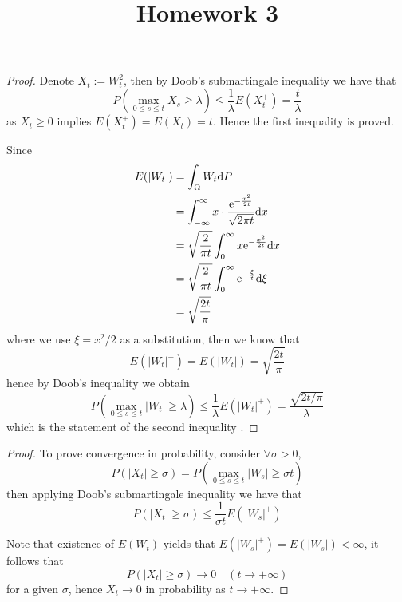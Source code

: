\documentclass{homework}
\title{Homework 3}
\begin{document}
    \maketitle

    \problem
    \begin{proof}
        Denote $X_t:=W_t^2$, then by Doob's submartingale inequality
        we have that
        \[P\left(\max_{0\leq s\leq t}X_s\geq\lambda\right)
        \leq\frac{1}{\lambda}E(X_t^+)=\frac{t}{\lambda}\]
        as $X_t\geq 0$ implies $E(X_t^+)=E(X_t)=t$. Hence the
        first inequality is proved.

        Since
        \[\begin{aligned}
            E(|W_t|)&=\int_{\Omega}W_t\mathrm d P\\
            &=\int_{-\infty}^\infty x\cdot
              \frac{\mathrm e^{-\frac{x^2}{2t}}}{\sqrt{2\pi t}}
              \mathrm d x\\
            &=\sqrt{\frac{2}{\pi t}}\int_0^\infty x\mathrm e^{-\frac{x^2}{2t}}\mathrm d x\\
            &=\sqrt{\frac{2}{\pi t}}\int_0^\infty \mathrm e^{-\frac{\xi}{t}}\mathrm d\xi\\
            &=\sqrt{\frac{2t}{\pi}}
        \end{aligned}\]
        where we use $\xi=x^2/2$ as a substitution,
        then we know that
        \[E(|W_t|^+)=E(|W_t|)=\sqrt{\frac{2t}{\pi}}\]
        hence by Doob's inequality we obtain
        \[P\left(\max_{0\leq s\leq t}|W_t|\geq\lambda\right)
        \leq\frac{1}{\lambda}E(|W_t|^+)=\frac{\sqrt{2t/\pi}}{\lambda}\]
        which is the statement of the second inequality
        .
    \end{proof}

    \problem
    \begin{proof}
        To prove convergence in probability, consider
        $\forall\sigma>0$,
        \[P(|X_t|\geq\sigma)
        =P\left(\max_{0\leq s\leq t}|W_s|\geq\sigma t\right)\]
        then applying Doob's submartingale inequality we have that
        \[P(|X_t|\geq\sigma)\leq\frac{1}{\sigma t}E(|W_s|^+)\]

        Note that existence of $E(W_t)$ yields that
        $E(|W_s|^+)=E(|W_s|)<\infty$, it follows that
        \[P(|X_t|\geq\sigma)\to 0\quad (t\to +\infty)\]
        for a given $\sigma$, hence $X_t\to 0$ in probability
        as $t\to +\infty$.
    \end{proof}
\end{document}

